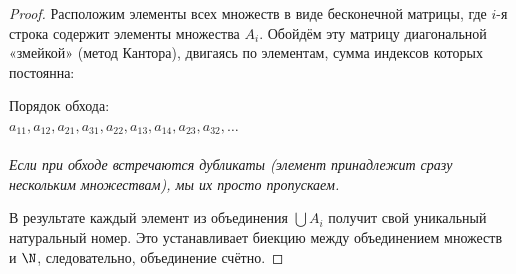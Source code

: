 \begin{proof}
    Расположим элементы всех множеств в виде бесконечной матрицы, где $i$-я строка содержит элементы множества $A_i$. Обойдём эту матрицу диагональной «змейкой» (метод Кантора), двигаясь по элементам, сумма индексов которых постоянна:
    
    \vspace{1em}
    \begin{minipage}[c]{0.55\textwidth}
    \end{minipage}
    \begin{minipage}[c]{0.4\textwidth}
    Порядок обхода: \\
    $a_{11}, a_{12}, a_{21}, a_{31}, a_{22}, a_{13}, a_{14}, a_{23}, a_{32}, \dots$ \\
    \\
    \textit{Если при обходе встречаются дубликаты (элемент принадлежит сразу нескольким множествам), мы их просто пропускаем.}
    \end{minipage}
    \vspace{1em}
    
    В результате каждый элемент из объединения $\bigcup A_i$ получит свой уникальный натуральный номер. Это устанавливает биекцию между объединением множеств и $\N$, следовательно, объединение счётно.
\end{proof}



